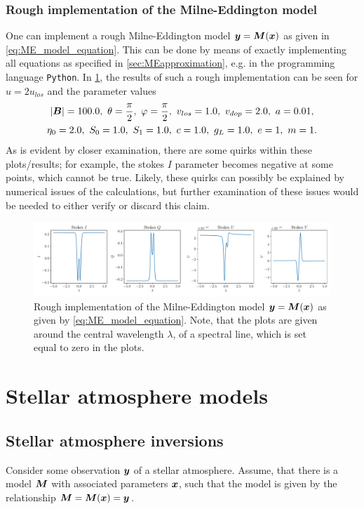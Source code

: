 \documentclass[a4paper,12pt]{report}
\begin{document}
\subsubsection{Rough implementation of the Milne-Eddington model}
One can implement a rough Milne-Eddington model  $\bm{y} = \bm{M}(\bm{x})$ as given in \cref{eq:ME_model_equation}. This can be done by means of exactly implementing all equations as specified in \cref{sec:MEapproximation}, e.g. in the programming language \verb|Python|. In \cref{fig:MEroughimplementation}, the results of such a rough implementation can be seen for $u = 2u_{los}$ and the parameter values \begin{gather}\begin{gathered}
|\vect{B}| = 100.0,\ \theta = \frac{\pi}{2},\ \varphi = \frac{\pi}{2},\ v_{los}=1.0,\ v_{dop}=2.0,\ a = 0.01,\\ \eta_0 = 2.0,\ S_0 = 1.0,\ S_1 = 1.0,\ c = 1.0, \ g_L = 1.0,\ e = 1,\ m=1.
\end{gathered}\end{gather} As is evident by closer examination, there are some quirks within these plots/results; for example, the stokes $I$ parameter becomes negative at some points, which cannot be true. Likely, these quirks can possibly be explained by numerical issues of the calculations, but further examination of these issues would be needed to either verify or discard this claim.
\begin{figure}[h]
\centering
\includegraphics[width=\textwidth]{figures/MEimplementation.pdf}
\caption{Rough implementation of the Milne-Eddington model $\bm{y} = \bm{M}(\bm{x})$ as given by \cref{eq:ME_model_equation}. Note, that the plots are given around the central wavelength $\lambda$, of a spectral line, which is set equal to zero in the plots.}
\label{fig:MEroughimplementation}
\end{figure}

\section{Stellar atmosphere models}
\subsection{Stellar atmosphere inversions}
Consider some observation $\bm{y}$ of a stellar atmosphere. Assume, that there is a model $\bm{M}$ with associated parameters $\bm{x}$, such that the model is given by the relationship $\bm{M} = \bm{M}(\bm{x}) = \bm{y}$.
\end{document}

